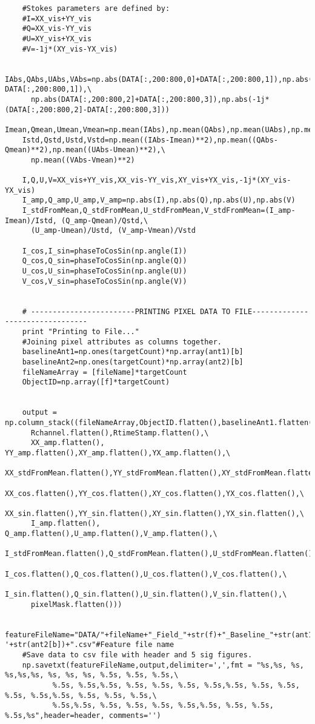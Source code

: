 \begin{verbatim}
    #Stokes parameters are defined by:
    #I=XX_vis+YY_vis					
    #Q=XX_vis-YY_vis
    #U=XY_vis+YX_vis
    #V=-1j*(XY_vis-YX_vis) 
   
    IAbs,QAbs,UAbs,VAbs=np.abs(DATA[:,200:800,0]+DATA[:,200:800,1]),np.abs(DATA[:,200:800,0]-DATA[:,200:800,1]),\
      np.abs(DATA[:,200:800,2]+DATA[:,200:800,3]),np.abs(-1j*(DATA[:,200:800,2]-DATA[:,200:800,3]))
    Imean,Qmean,Umean,Vmean=np.mean(IAbs),np.mean(QAbs),np.mean(UAbs),np.mean(VAbs)
    Istd,Qstd,Ustd,Vstd=np.mean((IAbs-Imean)**2),np.mean((QAbs-Qmean)**2),np.mean((UAbs-Umean)**2),\
      np.mean((VAbs-Vmean)**2)
    
    I,Q,U,V=XX_vis+YY_vis,XX_vis-YY_vis,XY_vis+YX_vis,-1j*(XY_vis-YX_vis)
    I_amp,Q_amp,U_amp,V_amp=np.abs(I),np.abs(Q),np.abs(U),np.abs(V)
    I_stdFromMean,Q_stdFromMean,U_stdFromMean,V_stdFromMean=(I_amp-Imean)/Istd, (Q_amp-Qmean)/Qstd,\
      (U_amp-Umean)/Ustd, (V_amp-Vmean)/Vstd	
    
    I_cos,I_sin=phaseToCosSin(np.angle(I))
    Q_cos,Q_sin=phaseToCosSin(np.angle(Q))
    U_cos,U_sin=phaseToCosSin(np.angle(U))
    V_cos,V_sin=phaseToCosSin(np.angle(V))


    # ------------------------PRINTING PIXEL DATA TO FILE--------------------------------
    print "Printing to File..."
    #Joining pixel attributes as columns together.
    baselineAnt1=np.ones(targetCount)*np.array(ant1)[b]
    baselineAnt2=np.ones(targetCount)*np.array(ant2)[b]
    fileNameArray = [fileName]*targetCount
    ObjectID=np.array([f]*targetCount)
    
    
    output = np.column_stack((fileNameArray,ObjectID.flatten(),baselineAnt1.flatten(),baselineAnt2.flatten(),\
      Rchannel.flatten(),RtimeStamp.flatten(),\
      XX_amp.flatten(), YY_amp.flatten(),XY_amp.flatten(),YX_amp.flatten(),\
      XX_stdFromMean.flatten(),YY_stdFromMean.flatten(),XY_stdFromMean.flatten(),YX_stdFromMean.flatten(),\
      XX_cos.flatten(),YY_cos.flatten(),XY_cos.flatten(),YX_cos.flatten(),\
      XX_sin.flatten(),YY_sin.flatten(),XY_sin.flatten(),YX_sin.flatten(),\
      I_amp.flatten(), Q_amp.flatten(),U_amp.flatten(),V_amp.flatten(),\
      I_stdFromMean.flatten(),Q_stdFromMean.flatten(),U_stdFromMean.flatten(),V_stdFromMean.flatten(),\
      I_cos.flatten(),Q_cos.flatten(),U_cos.flatten(),V_cos.flatten(),\
      I_sin.flatten(),Q_sin.flatten(),U_sin.flatten(),V_sin.flatten(),\
      pixelMask.flatten()))
    
    featureFileName="DATA/"+fileName+"_Field_"+str(f)+"_Baseline_"+str(ant1[b])+'-'+str(ant2[b])+".csv"#Feature file name
    #Save data to csv file with header and 5 sig figures.
    np.savetxt(featureFileName,output,delimiter=',',fmt = "%s,%s, %s, %s,%s,%s, %s, %s, %s, %.5s, %.5s, %.5s,\
	       %.5s, %.5s,%.5s, %.5s, %.5s, %.5s, %.5s,%.5s, %.5s, %.5s, %.5s, %.5s,%.5s, %.5s, %.5s, %.5s,\
	       %.5s,%.5s, %.5s, %.5s, %.5s, %.5s,%.5s, %.5s, %.5s, %.5s,%s",header=header, comments='')
 

\end{verbatim}
